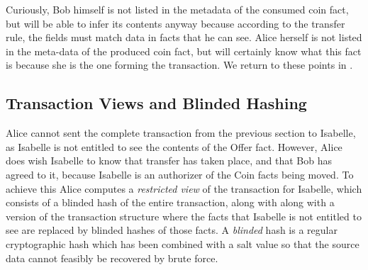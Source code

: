 Curiously, Bob himself is not listed in the metadata of the consumed coin fact, but will be able to infer its contents anyway because according to the transfer rule, the fields must match data in facts that he can see. Alice herself is not listed in the meta-data of the produced coin fact, but will certainly know what this fact is because she is the one forming the transaction. We return to these points in \REF.


\subsection{Transaction Views and Blinded Hashing}

Alice cannot sent the complete transaction from the previous section to Isabelle, as Isabelle is not entitled to see the contents of the Offer fact. However, Alice does wish Isabelle to know that transfer has taken place, and that Bob has agreed to it, because Isabelle is an authorizer of the Coin facts being moved. To achieve this Alice computes a \emph{restricted view} of the transaction for Isabelle, which consists of a blinded hash of the entire transaction, along with along with a version of the transaction structure where the facts that Isabelle is not entitled to see are replaced by blinded hashes of those facts. A \emph{blinded} hash is a regular cryptographic hash which has been combined with a salt value so that the source data cannot feasibly be recovered by brute force.

